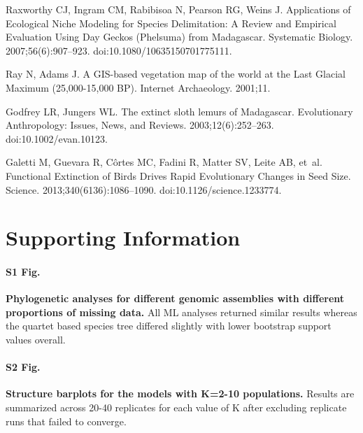 \documentclass[10pt,letterpaper]{article}
\begin{document}
\begin{thebibliography}{10}
  Raxworthy CJ, Ingram CM, Rabibisoa N, Pearson RG, Weins J.
  \newblock Applications of {Ecological} {Niche} {Modeling} for {Species}
  {Delimitation}: {A} {Review} and {Empirical} {Evaluation} {Using} {Day}
  {Geckos} ({Phelsuma}) from {Madagascar}.
  \newblock Systematic Biology. 2007;56(6):907--923.
  \newblock doi:{10.1080/10635150701775111}.
  

  Ray N, Adams J.
  \newblock A {GIS}-based vegetation map of the world at the {Last} {Glacial} {Maximum} (25,000-15,000 {BP}).
  \newblock Internet Archaeology. 2001;11.

  Godfrey LR, Jungers WL.
  \newblock The extinct sloth lemurs of {Madagascar}.
  \newblock Evolutionary Anthropology: Issues, News, and Reviews.
  2003;12(6):252--263.
  \newblock doi:{10.1002/evan.10123}.
  

  Galetti M, Guevara R, Côrtes MC, Fadini R, Matter SV, Leite AB, et~al.
  \newblock Functional {Extinction} of {Birds} {Drives} {Rapid} {Evolutionary}
  {Changes} in {Seed} {Size}.
  \newblock Science. 2013;340(6136):1086--1090.
  \newblock doi:{10.1126/science.1233774}.
  

\end{thebibliography}


\section*{Supporting Information}

\paragraph*{S1 Fig.}
\label{suppfig:1}
{\bf Phylogenetic analyses for different genomic assemblies with different proportions of missing data.}
All ML analyses returned similar results whereas the quartet based species tree differed slightly
with lower bootstrap support values overall.

\paragraph*{S2 Fig.}
\label{suppfig:2}
{\bf Structure barplots for the models with K=2-10 populations.}
Results are summarized across 20-40 replicates for each value of K after excluding replicate
runs that failed to converge.
\end{document}

